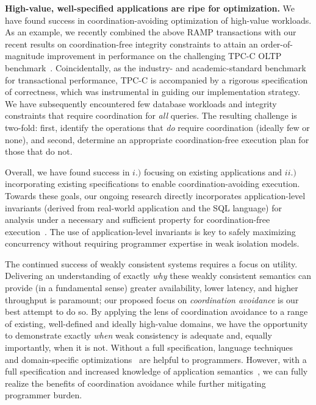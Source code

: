 \begin{myitemize}
\item \textbf{High-value, well-specified applications are ripe for optimization.} We have found success in coordination-avoiding optimization of high-value workloads. As an example, we recently combined the above RAMP transactions with our recent results on coordination-free integrity constraints to attain an order-of-magnitude improvement in performance on the challenging TPC-C OLTP benchmark~\cite{coord-avoid,tpcc}. Coincidentally, as the industry- and academic-standard benchmark for transactional performance, TPC-C is accompanied by a rigorous specification of correctness, which was instrumental in guiding our implementation strategy. We have subsequently encountered few database workloads and integrity constraints that require coordination for \textit{all} queries. The resulting challenge is two-fold: first, identify the operations that \textit{do} require coordination (ideally few or none), and second, determine an appropriate coordination-free execution plan for those that do not.  \end{myitemize}

Overall, we have found success in $i.)$ focusing on existing applications and $ii.)$ incorporating existing specifications to enable coordination-avoiding execution. Towards these goals, our ongoing research directly incorporates application-level invariants (derived from real-world application and the SQL language) for analysis under a necessary and sufficient property for coordination-free execution~\cite{coord-avoid}. The use of application-level invariants is key to safely maximizing concurrency without requiring programmer expertise in weak isolation models.

 The continued success of weakly consistent systems requires a focus on utility. Delivering an understanding of exactly \textit{why} these weakly consistent semantics can provide (in a fundamental sense) greater availability, lower latency, and higher throughput is paramount; our proposed focus on \textit{coordination avoidance} is our best attempt to do so. By applying the lens of coordination avoidance to a range of existing, well-defined and ideally high-value domains, we have the opportunity to demonstrate exactly \textit{when} weak consistency is adequate and, equally importantly, when it is not. Without a full specification, language techniques~\cite{calm,blazes} and domain-specific optimizations~\cite{crdt} are helpful to programmers. However, with a full specification and increased knowledge of application semantics~\cite{coord-avoid,ramp-txns}, we can fully realize the benefits of coordination avoidance while further mitigating programmer burden.
